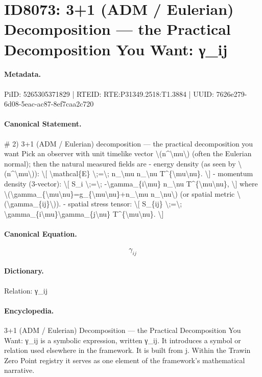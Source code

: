\section*{ID8073: 3+1 (ADM / Eulerian) Decomposition — the Practical Decomposition You Want: γ\_ij}
\paragraph{Metadata.}
PiID: 5265305371829 | RTEID: RTE:P31349.2518:T1.3884 | UUID: 7626e279-6d08-5eac-ac87-8ef7caa2c720

\paragraph{Canonical Statement.}
\# 2) 3+1 (ADM / Eulerian) decomposition — the practical decomposition you want Pick an observer with unit timelike vector \textbackslash{}(n\textasciicircum{}\textbackslash{}mu\textbackslash{}) (often the Eulerian normal); then the natural measured fields are - energy density (as seen by \textbackslash{}(n\textasciicircum{}\textbackslash{}mu\textbackslash{})): \textbackslash{}[ \textbackslash{}mathcal\{E\} \textbackslash{};=\textbackslash{}; n\_\textbackslash{}mu n\_\textbackslash{}nu T\textasciicircum{}\{\textbackslash{}mu\textbackslash{}nu\}. \textbackslash{}] - momentum density (3-vector): \textbackslash{}[ S\_i \textbackslash{};=\textbackslash{}; -\textbackslash{}gamma\_\{i\textbackslash{}mu\} n\_\textbackslash{}nu T\textasciicircum{}\{\textbackslash{}mu\textbackslash{}nu\}, \textbackslash{}] where \textbackslash{}(\textbackslash{}gamma\_\{\textbackslash{}mu\textbackslash{}nu\}=g\_\{\textbackslash{}mu\textbackslash{}nu\}+n\_\textbackslash{}mu n\_\textbackslash{}nu\textbackslash{}) (or spatial metric \textbackslash{}(\textbackslash{}gamma\_\{ij\}\textbackslash{})). - spatial stress tensor: \textbackslash{}[ S\_\{ij\} \textbackslash{};=\textbackslash{}; \textbackslash{}gamma\_\{i\textbackslash{}mu\}\textbackslash{}gamma\_\{j\textbackslash{}nu\} T\textasciicircum{}\{\textbackslash{}mu\textbackslash{}nu\}. \textbackslash{}]

\paragraph{Canonical Equation.}
\[
\gamma_{ij}
\]

\paragraph{Dictionary.}
Relation: γ\_ij

\paragraph{Encyclopedia.}
3+1 (ADM / Eulerian) Decomposition — the Practical Decomposition You Want: γ\_ij is a symbolic expression, written γ\_ij. It introduces a symbol or relation used elsewhere in the framework. It is built from j. Within the Trawin Zero Point registry it serves as one element of the framework's mathematical narrative.
